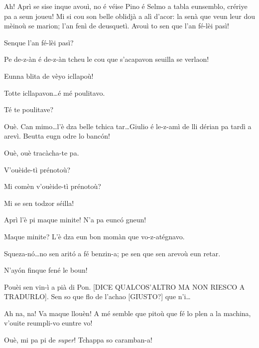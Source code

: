 \begin{drama}
\Bertaspeaks Ah! Aprì se sise inque avouì, no é véise Pino é Selmo a tabla eunsemblo, crériye pa a seun joueu! Mi si cou son belle oblidjà a alì d'acor: la senà que veun leur dou mèinoù se marion; l'an fenì de deusquetì. Avouì to sen que l'an fé-lèi pasì!

\Helenespeaks Senque l'an fé-lèi pasì?

\Bertaspeaks Pe de-z-àn é de-z-àn tcheu le cou que s'acapavon seuilla se verlaon!

\Dorinaspeaks Eunna blita de vèyo icllapoù!

\Bertaspeaks Totte icllapavon\ldots é mé poulitavo.

\Helenespeaks Té te poulitave?

\Bertaspeaks Ouè. Can mimo\ldots l'è dza belle tchica tar\ldots Giulio é le-z-amì de lli dérian pa tardì a arevì. Beutta eugn odre lo banc\'on!

\Helenespeaks Ouè, ouè tracàcha-te pa.



\Dorinaspeaks{} V'ouèide-tì prénotoù?

\Federicospeaks{} Mi comèn v'ouèide-tì prénotoù? 

\Marcospeaks Mi se sen todzor séilla! 

\Michelspeaks Aprì l'è pi maque minite! N'a pa eunc\'o gneun!

\Bertaspeaks Maque minite? L'è dza eun bon momàn que vo-z-atégnavo.

\Federicospeaks{} Squeza-n\'o\ldots no sen arit\'o a fé benzin-a; pe sen que sen arevoù eun retar.

\Marcospeaks N'ay\'on finque fené le boun!

\Michelspeaks Pouèi sen vin-ì a pià di Pon. [DICE QUALCOS'ALTRO MA NON RIESCO A TRADURLO].  Sen so que flo de l'achao [GIUSTO?] que n'i\ldots


\Dorinaspeaks Ah na, na! Va maque llouèn! A mé semble que pitoù que fé lo plen a la machina, v'ouite reumpli-vo euntre vo!

\Federicospeaks Ouè, mi pa pi de \textit{super}!  Tchappa so caramban-a!


\end{drama}
